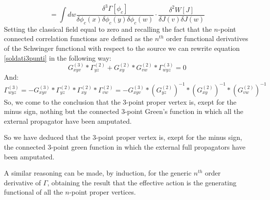 \begin{equation*}
 =  \int dw \frac{\delta^3\Gamma[\phi_c]}{\delta\phi_c(x)\delta\phi_c(y)\delta\phi_c(w)}\cdot\frac{\delta^2W[J]}{\delta J(v)\delta J(w)}
\end{equation*}
Setting the classical field equal to zero and recalling the fact that the $n$-point connected correlation functions are defined as the $n^{th}$ order functional derivatives of the 
Schwinger functional with respect to the source we can rewrite equation \eqref{soldati3punti} in the following way:
\begin{equation}
 G^{(3)}_{xyv}*\Gamma^{(2)}_{yz} + G^{(2)}_{xy} *G^{(2)}_{vw}*\Gamma^{(3)}_{wyz} = 0
\end{equation}
And:
\begin{equation}
 \Gamma^{(3)}_{wyz} = -G^{(3)}_{xyv}*\Gamma^{(2)}_{yz} *\Gamma^{(2)}_{xy} *\Gamma^{(2)}_{vw} = - G^{(3)}_{xyv}*\left(G^{(2)}_{yz}\right)^{-1} *\left(G^{(2)}_{xy}\right)^{-1} *\left(G^{(2)}_{vw}\right)^{-1}
\end{equation}
So, we come to the conclusion that the $3$-point proper vertex is, exept for the minus sign, nothing but the connected $3$-point Green's function in which all the external propagator have been 
amputated.

So we have deduced that the $3$-point proper vertex is, exept for the minus sign, the connected $3$-point green function in which the external full propagators have been amputated. 

A similar reasoning can be made, by induction, for the generic $n^{th}$ order derivative of $\Gamma$, 
obtaining the result that the effective action is the generating functional of all the $n$-point proper vertices.

